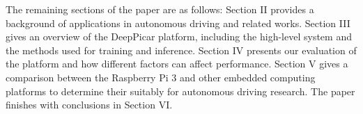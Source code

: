 
The remaining sections of the paper are as follows: Section II 
provides a background of applications in autonomous driving and related works.
 Section III gives an overview of the DeepPicar platform, including the 
high-level system and the methods used for training and inference. 
Section IV presents our evaluation of the platform and how different 
factors can affect performance. Section V gives a comparison between 
the Raspberry Pi 3 and other embedded computing platforms to 
determine their suitably for autonomous driving research. The paper finishes with 
conclusions in Section VI.

